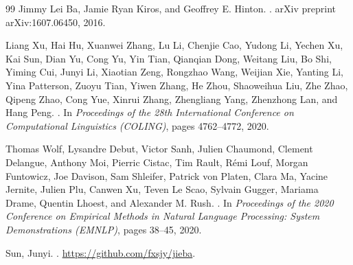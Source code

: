 \documentclass[a4paper]{article}
\begin{document}
\begin{thebibliography}{99}
Jimmy Lei Ba, Jamie Ryan Kiros, and Geoffrey E. Hinton.
.
\newblock arXiv preprint arXiv:1607.06450, 2016.

Liang Xu, Hai Hu, Xuanwei Zhang, Lu Li, Chenjie Cao, Yudong Li, Yechen Xu, Kai Sun, Dian Yu, Cong Yu, Yin Tian, Qianqian Dong, Weitang Liu, Bo Shi, Yiming Cui, Junyi Li, Xiaotian Zeng, Rongzhao Wang, Weijian Xie, Yanting Li, Yina Patterson, Zuoyu Tian, Yiwen Zhang, He Zhou, Shaoweihua Liu, Zhe Zhao, Qipeng Zhao, Cong Yue, Xinrui Zhang, Zhengliang Yang, Zhenzhong Lan, and Hang Peng.
.
\newblock In {\em Proceedings of the 28th International Conference on Computational Linguistics (COLING)}, pages 4762--4772, 2020.

Thomas Wolf, Lysandre Debut, Victor Sanh, Julien Chaumond, Clement Delangue, Anthony Moi, Pierric Cistac, Tim Rault, R{\'e}mi Louf, Morgan Funtowicz, Joe Davison, Sam Shleifer, Patrick von Platen, Clara Ma, Yacine Jernite, Julien Plu, Canwen Xu, Teven Le Scao, Sylvain Gugger, Mariama Drame, Quentin Lhoest, and Alexander M. Rush.
.
\newblock In {\em Proceedings of the 2020 Conference on Empirical Methods in Natural Language Processing: System Demonstrations (EMNLP)}, pages 38--45, 2020.

Sun, Junyi.
.
\newblock \url{https://github.com/fxsjy/jieba}.

\end{thebibliography}
\end{document}
